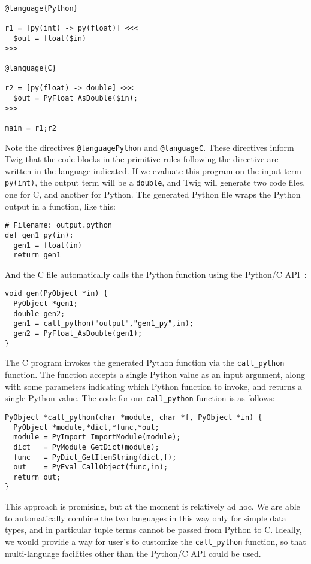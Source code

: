 \begin{verbatim}
@language{Python}

r1 = [py(int) -> py(float)] <<<
  $out = float($in)
>>>

@language{C}

r2 = [py(float) -> double] <<<
  $out = PyFloat_AsDouble($in);
>>>

main = r1;r2
\end{verbatim}

Note the directives \texttt{@language{Python}} and
\texttt{@language{C}}. These directives inform Twig that the code
blocks in the primitive rules following the directive are written
in the language indicated. If we evaluate this program on the
input term \texttt{py(int)}, the output term will be a
\texttt{double}, and Twig will generate two code files, one for C,
and another for Python. The generated Python file wraps the Python
output in a function, like this:

\begin{verbatim}
# Filename: output.python
def gen1_py(in):
  gen1 = float(in)
  return gen1
\end{verbatim}

And the C file automatically calls the Python function using the
Python/C API~\cite{python-c-api}:

\begin{verbatim}
void gen(PyObject *in) {
  PyObject *gen1;
  double gen2;
  gen1 = call_python("output","gen1_py",in);
  gen2 = PyFloat_AsDouble(gen1);
}
\end{verbatim}

The C program invokes the generated Python function via the
\texttt{call\_python} function. The function accepts a single
Python value as an input argument, along with some parameters
indicating which Python function to invoke, and returns a single
Python value. The code for our \texttt{call\_python} function is
as follows:

\begin{verbatim}
PyObject *call_python(char *module, char *f, PyObject *in) {
  PyObject *module,*dict,*func,*out;
  module = PyImport_ImportModule(module);
  dict   = PyModule_GetDict(module);
  func   = PyDict_GetItemString(dict,f);
  out    = PyEval_CallObject(func,in);
  return out;
}
\end{verbatim}

This approach is promising, but at the moment is relatively ad
hoc. We are able to automatically combine the two languages in
this way only for simple data types, and in particular tuple terms
cannot be passed from Python to C. Ideally, we would provide a way
for user's to customize the \texttt{call\_python} function, so
that multi-language facilities other than the Python/C API could
be used.

